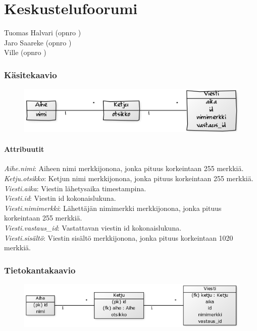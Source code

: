 \documentclass[12pt,a4paper]{article}
\begin{document}
\part*{Keskustelufoorumi}
Tuomas Halvari (opnro ) \\
Jaro Saareke (opnro ) \\
Ville  (opnro )
\newpage
\section{Käsitekaavio}
\begin{figure}[h]
\includegraphics[width=\textwidth]{6bd37a82}
\end{figure}
\subsection{Attribuutit}
\emph{Aihe.nimi}: Aiheen nimi merkkijonona, jonka pituus korkeintaan 255 merkkiä. \\
\emph{Ketju.otsikko}: Ketjun nimi  merkkijonona, jonka pituus korkeintaan 255 merkkiä. \\
\emph{Viesti.aika}: Viestin lähetysaika timestampina. \\
\emph{Viesti.id}: Viestin id kokonaislukuna. \\
\emph{Viesti.nimimerkki}: Lähettäjän nimimerkki merkkijonona, jonka pituus korkeintaan 255 merkkiä. \\
\emph{Viesti.vastaus\_id}: Vastattavan viestin id kokonaislukuna. \\
\emph{Viesti.sisältö}: Viestin sisältö merkkijonona, jonka pituus korkeintaan 1020 merkkiä. \\
\section{Tietokantakaavio}
\begin{figure}[h]
\includegraphics[width=\textwidth]{2ca63d43}
\end{figure}
\end{document}
